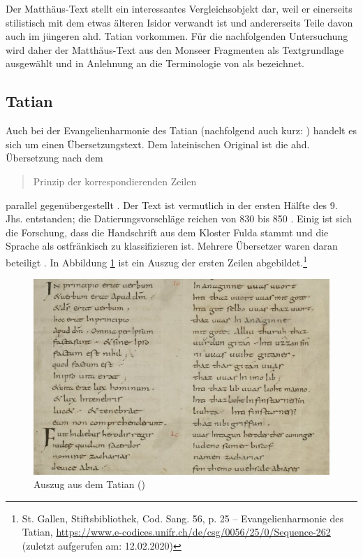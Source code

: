 Der Matthäus-Text stellt ein interessantes Vergleichsobjekt dar, weil er  einerseits stilistisch mit dem etwas älteren Isidor verwandt ist \parencite{Hench1893,Lippert1974} und andererseits Teile davon auch im jüngeren ahd. Tatian vorkommen. Für die nachfolgenden Untersuchung wird daher der Matthäus-Text aus den Monseer Fragmenten als Textgrundlage ausgewählt und in Anlehnung an die Terminologie von \textcite{Lippert1974} als  bezeichnet.
  
\subsection{Tatian}\label{sec:tatian}

Auch bei der Evangelienharmonie des Tatian (nachfolgend auch kurz: ) handelt es sich um einen Übersetzungstext. Dem lateinischen Original ist die ahd. Übersetzung nach dem \blockcquote[43]{Fleischer2011}{Prinzip der korrespondierenden Zeilen} parallel gegenübergestellt \parencite[vgl. hierzu auch][128]{Masser1997}. Der Text ist vermutlich in der ersten Hälfte des 9. Jhs. entstanden; die Datierungsvorschläge reichen von 830 \parencite[LXX]{Sievers1961} bis 850 \parencite[127]{Sonderegger2003}. Einig ist sich die Forschung, dass die Handschrift aus dem Kloster Fulda stammt und die Sprache als ostfränkisch zu klassifizieren ist. Mehrere Übersetzer waren daran beteiligt \parencite[s.][31]{Masser1994}. In Abbildung \ref{abb:tatian-hand} ist ein Auszug der ersten Zeilen abgebildet.\footnote{St. Gallen, Stiftsbibliothek, Cod. Sang. 56, p. 25 – Evangelienharmonie des Tatian, \url{https://www.e-codices.unifr.ch/de/csg/0056/25/0/Sequence-262} (zuletzt aufgerufen am: 12.02.2020)}

\begin{figure}[h]
\begin{center}
  \includegraphics[width=10 cm]{images/tatian-handschrift-ausschnitt.jpg}
\caption {Auszug aus dem Tatian ()}
\label{abb:tatian-hand}
\end{center}
\end{figure} 

